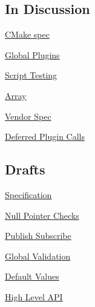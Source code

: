 \subsection*{In Discussion}


\begin{DoxyItemize}
\item \hyperlink{doc_decisions_cmake_spec_md}{C\+Make spec}
\item \hyperlink{doc_decisions_global_plugins_md}{Global Plugins}
\item \hyperlink{doc_decisions_script_testing_md}{Script Testing}
\item \hyperlink{doc_decisions_array_md}{Array}
\item \hyperlink{doc_decisions_vendor_spec_md}{Vendor Spec}
\item \hyperlink{doc_decisions_deferred_plugin_calls_md}{Deferred Plugin Calls}
\end{DoxyItemize}

\subsection*{Drafts}


\begin{DoxyItemize}
\item \hyperlink{doc_decisions_specification_md}{Specification}
\item \hyperlink{doc_decisions_null_pointer_checks_md}{Null Pointer Checks}
\item \hyperlink{doc_decisions_pubsub_md}{Publish Subscribe}
\item \hyperlink{doc_decisions_global_validation_md}{Global Validation}
\item \hyperlink{doc_decisions_default_values_md}{Default Values}
\item \hyperlink{doc_decisions_high_level_api_md}{High Level A\+PI} 
\end{DoxyItemize}